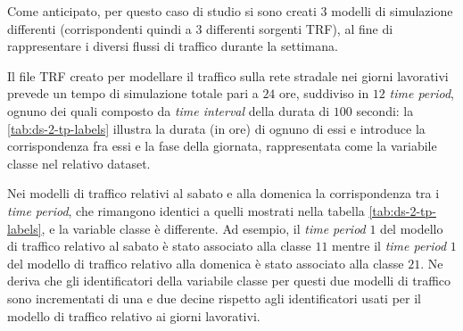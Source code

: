 Come anticipato, per questo caso di studio si sono creati $3$ modelli di simulazione differenti (corrispondenti quindi a $3$ differenti sorgenti \acs{TRF}), al fine di rappresentare i diversi flussi di traffico durante la settimana.

Il file \acs{TRF} creato per modellare il traffico sulla rete stradale nei giorni lavorativi prevede un tempo di simulazione totale pari a $24$ ore, suddiviso in $12$ \emph{time period}, ognuno dei quali composto da \emph{time interval} della durata di $100$ secondi: la \vref{tab:ds-2-tp-labels} illustra la durata (in ore) di ognuno di essi e introduce la corrispondenza fra essi e la fase della giornata, rappresentata come la variabile classe nel relativo dataset.

Nei modelli di traffico relativi al sabato e alla domenica la corrispondenza tra i \emph{time period}, che rimangono identici a quelli mostrati nella tabella \vref{tab:ds-2-tp-labels}, e la variable classe è differente. Ad esempio, il \emph{time period} $1$ del modello di traffico relativo al sabato è stato associato alla classe $11$ mentre il \emph{time period} $1$ del modello di traffico relativo alla domenica è stato associato alla classe $21$. Ne deriva che gli identificatori della variabile classe per questi due modelli di traffico sono incrementati di una e due decine rispetto agli identificatori usati per il modello di traffico relativo ai giorni lavorativi.
